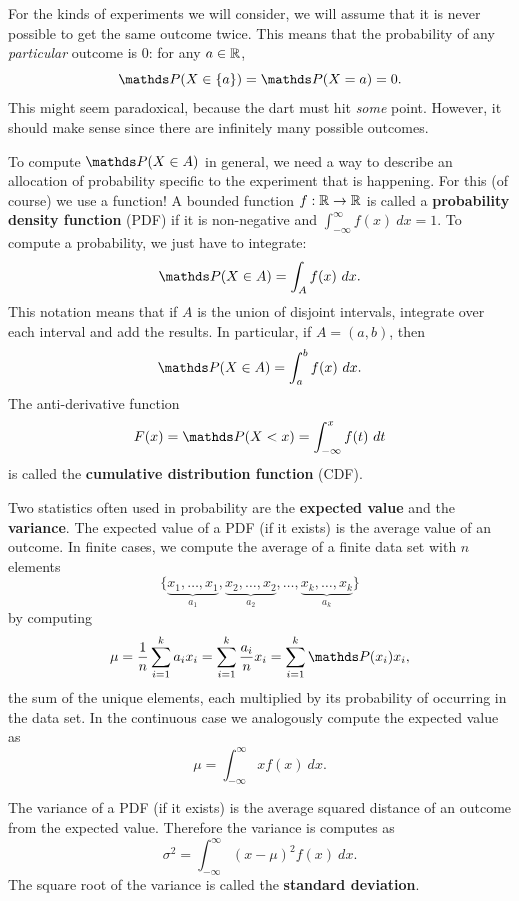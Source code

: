 For the kinds of experiments we will consider, we will assume that it is never possible to get the same outcome twice. This means that the probability of any \textit{particular} outcome is 0: for any $a\in\mathbb{R}$, $$\P(X\in\{a\})=\P(X=a)=0.$$
This might seem paradoxical, because the dart must hit \textit{some} point. However, it should make sense since there are infinitely many possible outcomes.

To compute $\P(X\in A)$ in general, we need a way to describe an allocation of probability specific to the experiment that is happening. For this (of course) we use a function! A bounded function $f:\mathbb{R} \to \mathbb{R}$ is called a \textbf{probability density function} (PDF) if it is non-negative and $\int_{-\infty}^\infty f(x)\ dx= 1$.
To compute a probability, we just have to integrate:
$$\P(X\in A) = \int_A f(x)\ dx.$$
This notation means that if $A$ is the union of disjoint intervals, integrate over each interval and add the results. In particular, if $A=(a,b)$, then
$$\P(X\in A) = \int_a^b f(x)\ dx.$$
The anti-derivative function
$$F(x)=\P(X<x) = \int_{-\infty}^x f(t)\ dt$$
is called the \textbf{cumulative distribution function} (CDF).

Two statistics often used in probability are the \textbf{expected value} and the \textbf{variance}. The expected value of a PDF (if it exists) is the average value of an outcome. In finite cases, we compute the average of a finite data set with $n$ elements
$$\{\underbrace{x_1,\dots, x_1}_{a_1}, \underbrace{x_2,\dots, x_2}_{a_2},\dots, \underbrace{x_k,\dots, x_k}_{a_k}\}$$
by computing
$$\mu=\frac{1}{n}\sum_{i=1}^ka_ix_i=\sum_{i=1}^k\frac{a_i}{n}x_i =\sum_{i=1}^k\P(x_i)x_i,$$
the sum of the unique elements, each multiplied by its probability of occurring in the data set. In the continuous case we analogously compute the expected value as
$$\mu=\int_{-\infty}^\infty xf(x)\ dx.$$

The variance of a PDF (if it exists) is the average squared distance of an outcome from the expected value. Therefore the variance is computes as
$$\sigma^2 = \int_{-\infty}^\infty (x-\mu)^2f(x)\ dx.$$
The square root of the variance is called the \textbf{standard deviation}.

